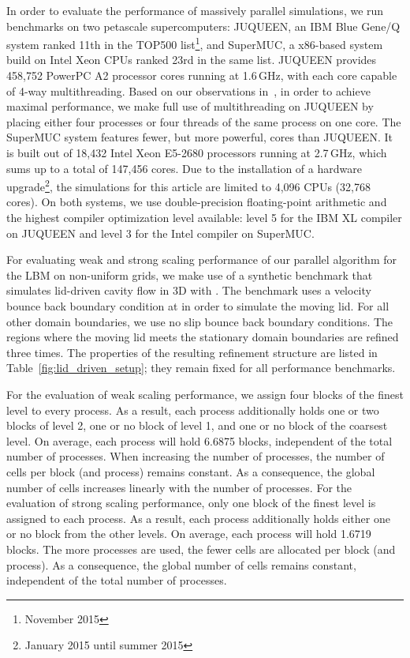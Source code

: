 \documentclass[final,leqno,onefignum,onetabnum]{siamltex1213}
\begin{document}
In order to evaluate the performance of massively parallel simulations, we run benchmarks on two petascale supercomputers:
JUQUEEN, an IBM Blue Gene/Q system ranked 11th in the TOP500 list\footnote{November 2015},
and SuperMUC, a x86-based system build on Intel Xeon CPUs ranked 23rd in the same list.
JUQUEEN provides 458,752 PowerPC A2 processor cores running at 1.6\,GHz, with each core capable of 4-way multithreading.
Based on our observations in~\cite{Godenschwager2013}, in order to achieve maximal performance,
we make full use of multithreading on JUQUEEN by placing either four processes or four threads of the same process on one core.
The SuperMUC system features fewer, but more powerful, cores than JUQUEEN.
It is built out of 18,432 Intel Xeon E5-2680 processors running at 2.7\,GHz, which sums up to a total of 147,456 cores.
Due to the installation of a hardware upgrade\footnote{January 2015 until summer 2015},
the simulations for this article are limited to 4,096 CPUs (32,768 cores).
On both systems, we use double-precision floating-point arithmetic and the highest compiler optimization level available:
level 5 for the IBM XL compiler on JUQUEEN and level 3 for the Intel compiler on SuperMUC.

For evaluating weak and strong scaling performance of our parallel algorithm for the LBM on non-uniform grids,
we make use of a synthetic benchmark that simulates lid-driven cavity flow in 3D with .
The benchmark uses a velocity bounce back boundary condition at  in order to simulate the moving lid.
For all other domain boundaries, we use no slip bounce back boundary conditions.
The regions where the moving lid meets the stationary domain boundaries are refined three times.
The properties of the resulting refinement structure are listed in Table~\ref{fig:lid_driven_setup}; they remain fixed for all performance benchmarks.

For the evaluation of weak scaling performance, we assign four blocks of the finest level to every process.
As a result, each process additionally holds one or two blocks of level 2, one or no block of level 1, and one or no block of the coarsest level.
On average, each process will hold 6.6875 blocks, independent of the total number of processes.
When increasing the number of processes, the number of cells per block (and process) remains constant.
As a consequence, the global number of cells increases linearly with the number of processes.
For the evaluation of strong scaling performance, only one block of the finest level is assigned to each process.
As a result, each process additionally holds either one or no block from the other levels.
On average, each process will hold 1.6719 blocks.
The more processes are used, the fewer cells are allocated per block (and process).
As a consequence, the global number of cells remains constant, independent of the total number of processes.
\end{document}
